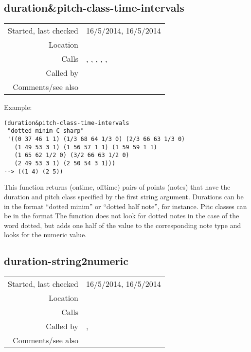 \subsection*{duration\&pitch-class-time-intervals}\label{fun:duration-n-pitch-class-time-intervals}

\vspace{0.3cm}
\begin{tabular}{r|p{8cm}}
Started, last checked & 16/5/2014, 16/5/2014 \\
Location & \nameref{sec:pitches-intervals-durations} \\
Calls & \nameref{fun:duration-string2numeric}, \nameref{fun:modify-question-by-staff-restriction}, \nameref{fun:my-last-string}, \nameref{fun:pitch-and-octave2MIDI-morphetic-pair}, \nameref{fun:replace-all},\newline \nameref{fun:restrict-dataset-in-nth-to-xs} \\
Called by & \\
Comments/see also &
\end{tabular}

\vspace{0.5cm}
\noindent Example:
\begin{verbatim}
(duration&pitch-class-time-intervals
 "dotted minim C sharp"
 '((0 37 46 1 1) (1/3 68 64 1/3 0) (2/3 66 63 1/3 0)
   (1 49 53 3 1) (1 56 57 1 1) (1 59 59 1 1)
   (1 65 62 1/2 0) (3/2 66 63 1/2 0)
   (2 49 53 3 1) (2 50 54 3 1)))
--> ((1 4) (2 5))
\end{verbatim}

\noindent This function returns (ontime, offtime)
pairs of points (notes) that have the duration and
pitch class specified by the first string argument.
Durations can be in the format ``dotted minim'' or
``dotted half note'', for instance. Pitc classes can
be in the format  The function does not look for dotted
notes in the case of the word dotted, but adds one
half of the value to the corresponding note type and
looks for the numeric value.


\subsection*{duration-string2numeric}\label{fun:duration-string2numeric}

\vspace{0.3cm}
\begin{tabular}{r|p{8cm}}
Started, last checked & 16/5/2014, 16/5/2014 \\
Location & \nameref{sec:pitches-intervals-durations} \\
Calls & \\
Called by & \nameref{fun:duration-n-pitch-class-time-intervals}, \nameref{fun:duration-time-intervals} \\
Comments/see also &
\end{tabular}


